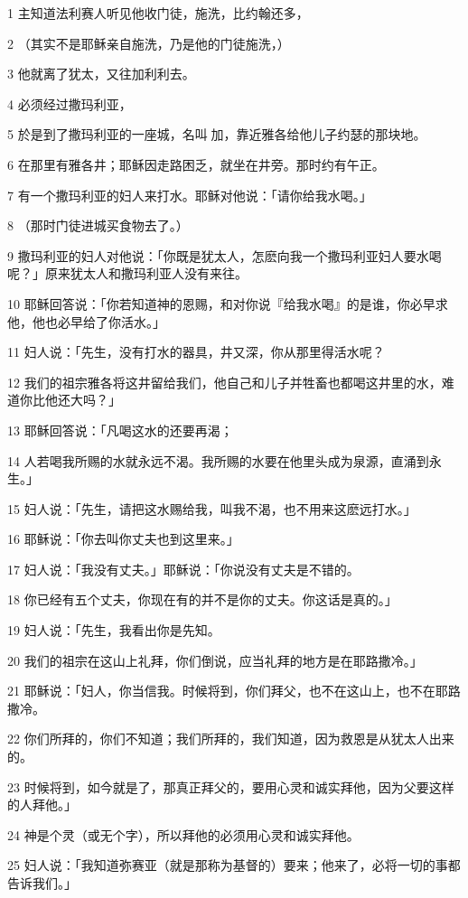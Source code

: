 \par 1 主知道法利赛人听见他收门徒，施洗，比约翰还多，
\par 2 （其实不是耶稣亲自施洗，乃是他的门徒施洗，）
\par 3 他就离了犹太，又往加利利去。
\par 4 必须经过撒玛利亚，
\par 5 於是到了撒玛利亚的一座城，名叫加，靠近雅各给他儿子约瑟的那块地。
\par 6 在那里有雅各井；耶稣因走路困乏，就坐在井旁。那时约有午正。
\par 7 有一个撒玛利亚的妇人来打水。耶稣对他说：「请你给我水喝。」
\par 8 （那时门徒进城买食物去了。）
\par 9 撒玛利亚的妇人对他说：「你既是犹太人，怎麽向我一个撒玛利亚妇人要水喝呢？」原来犹太人和撒玛利亚人没有来往。
\par 10 耶稣回答说：「你若知道神的恩赐，和对你说『给我水喝』的是谁，你必早求他，他也必早给了你活水。」
\par 11 妇人说：「先生，没有打水的器具，井又深，你从那里得活水呢？
\par 12 我们的祖宗雅各将这井留给我们，他自己和儿子并牲畜也都喝这井里的水，难道你比他还大吗？」
\par 13 耶稣回答说：「凡喝这水的还要再渴；
\par 14 人若喝我所赐的水就永远不渴。我所赐的水要在他里头成为泉源，直涌到永生。」
\par 15 妇人说：「先生，请把这水赐给我，叫我不渴，也不用来这麽远打水。」
\par 16 耶稣说：「你去叫你丈夫也到这里来。」
\par 17 妇人说：「我没有丈夫。」耶稣说：「你说没有丈夫是不错的。
\par 18 你已经有五个丈夫，你现在有的并不是你的丈夫。你这话是真的。」
\par 19 妇人说：「先生，我看出你是先知。
\par 20 我们的祖宗在这山上礼拜，你们倒说，应当礼拜的地方是在耶路撒冷。」
\par 21 耶稣说：「妇人，你当信我。时候将到，你们拜父，也不在这山上，也不在耶路撒冷。
\par 22 你们所拜的，你们不知道；我们所拜的，我们知道，因为救恩是从犹太人出来的。
\par 23 时候将到，如今就是了，那真正拜父的，要用心灵和诚实拜他，因为父要这样的人拜他。」
\par 24 神是个灵（或无个字），所以拜他的必须用心灵和诚实拜他。
\par 25 妇人说：「我知道弥赛亚（就是那称为基督的）要来；他来了，必将一切的事都告诉我们。」
